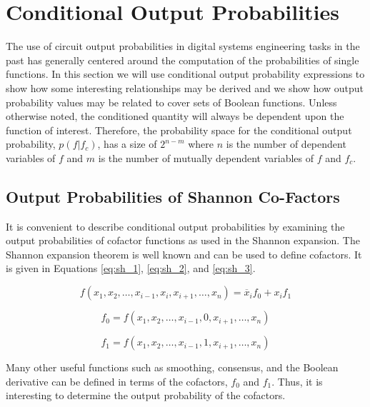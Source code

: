 \section{Conditional Output Probabilities}
The use of circuit output probabilities in digital systems engineering tasks
in the past has generally centered around the computation of the probabilities of single
functions. 
In this section we will use conditional output probability expressions
to show how some interesting relationships may be derived and we show
how output probability values may be related to cover sets of Boolean functions.
Unless otherwise noted, the conditioned quantity will always be dependent
upon the function of interest.  Therefore, the probability space for the
conditional output probability, $p(f | f_c)$, has a size of $2^{n-m}$ where
$n$ is the number of dependent variables of $f$ and $m$ is the number of mutually
dependent variables of $f$ and $f_c$.

\subsection{Output Probabilities of Shannon Co-Factors}
It is convenient to describe conditional output probabilities by examining the
output probabilities of cofactor functions as used in the Shannon expansion.
The Shannon expansion theorem is well known and can be used to define cofactors.
It is given in Equations \ref{eq:sh_1}, \ref{eq:sh_2}, and \ref{eq:sh_3}.

\begin{equation}
f(x_1, x_2, \ldots , x_{i-1}, x_i, x_{i+1}, \ldots , x_n) = \overline{x}_i f_0 + x_i f_1 \label{eq:sh_1}
\end{equation}

\begin{equation}
f_0 = f(x_1, x_2, \ldots , x_{i-1}, 0, x_{i+1}, \ldots , x_n) \label{eq:sh_2}
\end{equation}

\begin{equation}
f_1 = f(x_1, x_2, \ldots , x_{i-1}, 1, x_{i+1}, \ldots , x_n) \label{eq:sh_3}
\end{equation}

Many other useful functions such as smoothing, consensus, and the Boolean derivative can
be defined in terms of the cofactors, $f_0$ and $f_1$.  Thus, it is interesting to
determine the output probability of the cofactors.

